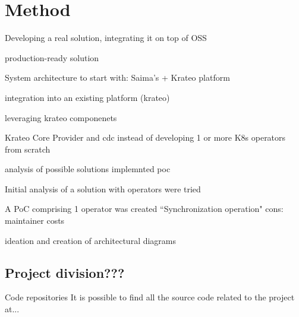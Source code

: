\chapter{Method}
\label{cha:method}


Developing a real solution, integrating it on top of OSS

production-ready solution

System architecture to start with: Saima's + Krateo platform

integration into an existing platform (krateo)


leveraging krateo componenets

Krateo Core Provider and cdc instead of developing 1 or more K8s operators from scratch


analysis of possible solutions
implemnted poc 

Initial analysis of a solution with operators were tried

A PoC comprising 1 operator was created 
``Synchronization operation"
cons: maintainer costs



ideation and creation of architectural diagrams



\section{Project division???}
Code repositories
It is possible to find all the source code related to the project at...

\newpage

